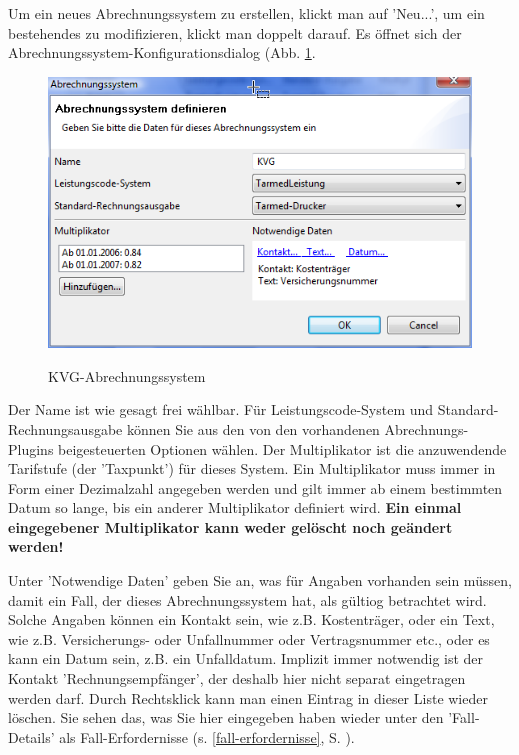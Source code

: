 \documentclass[a4paper]{scrartcl}
\begin{document}
\medskip

Um ein neues Abrechnungssystem zu erstellen, klickt man auf 'Neu...', um ein bestehendes zu modifizieren, klickt man doppelt darauf. Es öffnet sich der Abrechnungssystem-Konfigurationsdialog (Abb. \ref{fig:abr2}.
\begin{figure}
  \includegraphics{abr2}\\
  \caption{KVG-Abrechnungssystem}\label{fig:abr2}
\end{figure}
Der Name ist wie gesagt frei wählbar. Für Leistungscode-System und Standard-Rechnungsausgabe können Sie aus den von den vorhandenen Abrechnungs-Plugins beigesteuerten Optionen wählen. Der Multiplikator ist die anzuwendende Tarifstufe (der 'Taxpunkt') für dieses System. Ein Multiplikator muss immer in Form einer Dezimalzahl angegeben werden und gilt immer ab einem bestimmten Datum so lange, bis ein anderer Multiplikator definiert wird. \textbf{Ein einmal eingegebener Multiplikator kann weder gelöscht noch geändert werden!}

Unter 'Notwendige Daten' geben Sie an, was für Angaben vorhanden sein müssen, damit ein Fall, der dieses Abrechnungssystem hat, als gültiog betrachtet wird. Solche Angaben können ein Kontakt sein, wie z.B. Kostenträger, oder ein Text, wie z.B. Versicherungs- oder Unfallnummer oder Vertragsnummer etc., oder es kann ein Datum sein, z.B. ein Unfalldatum.
Implizit immer notwendig ist der Kontakt 'Rechnungsempfänger', der deshalb hier nicht separat eingetragen werden darf.
Durch Rechtsklick kann man einen Eintrag in dieser Liste wieder löschen. Sie sehen das, was Sie hier eingegeben haben wieder unter den 'Fall-Details' als Fall-Erfordernisse (s. \ref{fall-erfordernisse}, S. \pageref{fall-erfordernisse}).
\end{document}
